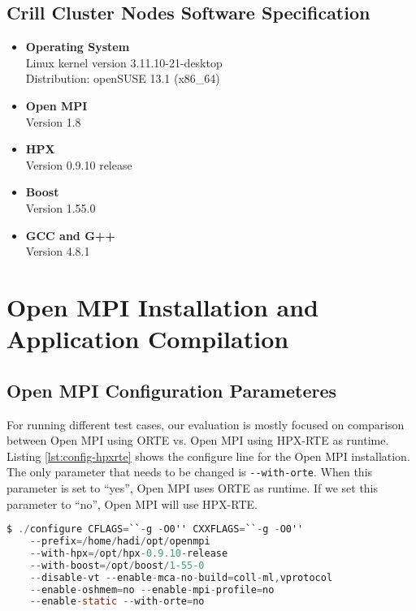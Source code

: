 \subsection{Crill Cluster Nodes Software Specification}
\begin{itemize}
\item \textbf{Operating System}\\
  Linux kernel version 3.11.10-21-desktop\\
  Distribution: openSUSE 13.1 (x86\_64)
\item \textbf{Open MPI}\\
  Version 1.8
\item \textbf{HPX}\\
  Version 0.9.10 release
\item \textbf{Boost}\\
  Version 1.55.0
\item \textbf{GCC and G++}\\
  Version 4.8.1
\end{itemize}


\section{Open MPI Installation and Application Compilation}

\subsection{Open MPI Configuration Parameteres}
For running different test cases, our evaluation is mostly focused on comparison between Open MPI using ORTE vs. Open MPI using HPX-RTE as runtime.
Listing \ref{lst:config-hpxrte} shows the configure line for the Open MPI installation. The only parameter that needs to be changed is \verb|--with-orte|. When this parameter is set to ``yes'', Open MPI uses ORTE as runtime. If we set this parameter to ``no'', Open MPI will use HPX-RTE.

\begin{lstlisting}[language=C, frame=single, basicstyle=\footnotesize, caption=Configure Line of Open MPI with HPX-RTE\label{lst:config-hpxrte}]
  $ ./configure CFLAGS=``-g -O0'' CXXFLAGS=``-g -O0''
    --prefix=/home/hadi/opt/openmpi
    --with-hpx=/opt/hpx-0.9.10-release
    --with-boost=/opt/boost/1-55-0
    --disable-vt --enable-mca-no-build=coll-ml,vprotocol
    --enable-oshmem=no --enable-mpi-profile=no
    --enable-static --with-orte=no
\end{lstlisting}

